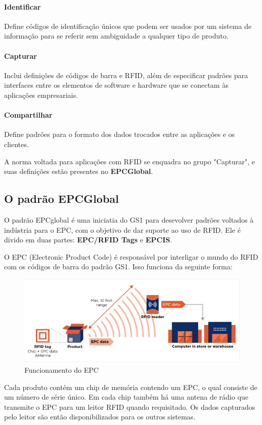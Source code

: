 	\paragraph{Identificar} Define códigos de identificação únicos que podem ser usados por um sistema de informação para se referir sem ambiguidade a qualquer tipo de produto.
	\paragraph{Capturar} Inclui definições de códigos de barra e RFID, além de especificar padrões para interfaces entre os elementos de software e hardware que se conectam às aplicações empresariais.
	\paragraph{Compartilhar} Define padrões para o formato dos dados trocados entre as aplicações e os clientes.     

	A norma voltada para aplicações com RFID se enquadra no grupo "Capturar", e suas definições estão presentes no \textbf{EPCGlobal}.


\subsection{O padrão EPCGlobal}
	O padrão EPCglobal é uma iniciatia do GS1 para desevolver padrões voltados à indústria para o EPC, com o objetivo de dar suporte ao uso de RFID. Ele é divido em duas partes: \textbf{EPC/RFID Tags} e \textbf{EPCIS}. 
	
	O EPC (Electronic Product Code) é responsável por interligar o mundo do RFID com os códigos de barra do padrão GS1. Isso funciona da seguinte forma:
		\begin{figure}[h!]
			\centering
			\includegraphics[width=0.5\linewidth]{epcrfid}
			\caption{Funcionamento do EPC}
			\label{fig:epcrfid}
		\end{figure}
	
	Cada produto contém um chip de memória contendo um EPC, o qual consiste de um número de série único. Em cada chip também há uma antena de rádio que transmite o EPC para um leitor RFID quando requisitado. Os dados capturados pelo leitor são então disponibilizados para os outros sistemas.
	
